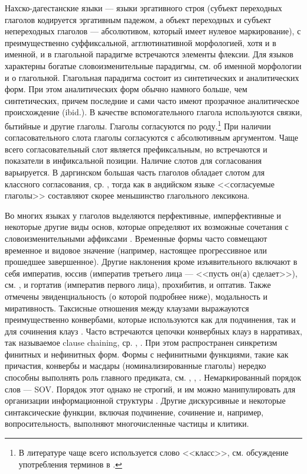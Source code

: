 Нахско-дагестанские языки --- языки эргативного строя (субъект переходных глаголов кодируется эргативным падежом, а объект переходных и субъект непереходных глаголов --- абсолютивом, который имеет нулевое маркирование), с преимущественно суффиксальной, агглютинативной морфологией, хотя и в именной, и в глагольной парадигме встречаются элементы флексии. Для языков характерны богатые словоизменительные парадигмы, см. \citep{kibrik2003} об именной морфологии и \citep{forker2018intro} о глагольной. Глагольная парадигма состоит из синтетических и аналитических форм. При этом аналитических форм обычно намного больше, чем синтетических, причем последние и сами часто имеют прозрачное аналитическое происхождение (ibid.). В качестве вспомогательного глагола используются связки, бытийные и другие глаголы. Глаголы согласуются по роду.\footnote{В литературе чаще всего используется слово <<класс>>, см. обсуждение употребления терминов в \citep[155]{vandenberg2005}.} При наличии согласовательного слота глаголы согласуются с абсолютивным аргументом. Чаще всего согласовательный слот является префиксальным, но встречаются и показатели в инфиксальной позиции. Наличие слотов для согласования варьируется. В даргинском большая часть глаголов обладает слотом для классного согласования, ср. \citep{sumbatova2010}, тогда как в андийском языке <<согласуемые глаголы>> составляют скорее меньшинство глагольного лексикона.
\par Во многих языках у глаголов выделяются перфективные, имперфективные и некоторые другие виды основ, которые определяют их возможные сочетания с словоизменительными аффиксами \citep[165--170]{vandenberg2005}. Временные формы часто совмещают временное и видовое значение (например, настоящее прогрессивное или прошедшее завершенное). Другие наклонения кроме изъявительного включают в себя императив, юссив (императив третьего лица --- <<пусть он(а) сделает>>), см. \citep{dobrushina2012}, и гортатив (императив первого лица), прохибитив, и оптатив. Также отмечены эвиденциальность (о которой подробнее ниже), модальность и миративность. Таксисные отношения между клаузами выражауются преимущественно конвербами, которые используются как для подчинения, так и для сочинения клауз \citep{kibrik2007}. Часто встречаются цепочки конвербных клауз в нарративах, так называемое clause chaining, ср. \citep{nedjalkov1995}, \citep{nicholspeterson2010}. При этом распространен синкретизм финитных и нефинитных форм. Формы с нефинитными функциями, такие как причастия, конвербы и масдары (номинализированные глаголы) нередко способны выполнять роль главного предиката, см. \citep{kalininasumbatova2007}, \citep{kazenintestelets2004}, \citep{creissels2009}. Немаркированный порядок слов --- SOV. Порядок этот однако не строгий, и им можно манипулировать для организации информационной структуры \citep{belyaevforker2016}. Другие дискурсивные и некоторые синтаксические функции, включая подчинение, сочинение и, например, вопросительность, выполняют многочисленные частицы и клитики.
